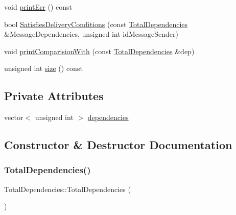 \begin{DoxyCompactItemize}
\item 
void \hyperlink{class_total_dependencies_a514df10fe452f2000ceec5e279eae802}{print\+Err} () const
\item 
bool \hyperlink{class_total_dependencies_a6d050146cb0298091a4614610997d772}{Satisfies\+Delivery\+Conditions} (const \hyperlink{class_total_dependencies}{Total\+Dependencies} \&Message\+Dependencies, unsigned int id\+Message\+Sender)
\item 
void \hyperlink{class_total_dependencies_a56c23f6400891bc8acb3a2bd03f42b12}{print\+Comparision\+With} (const \hyperlink{class_total_dependencies}{Total\+Dependencies} \&dep)
\item 
unsigned int \hyperlink{class_total_dependencies_a00ea27540cc51d5770d6013a21a41de2}{size} () const
\end{DoxyCompactItemize}
\subsection*{Private Attributes}
\begin{DoxyCompactItemize}
\item 
vector$<$ unsigned int $>$ \hyperlink{class_total_dependencies_a94825b4f782c30dfebf69dd2eba0bb1f}{dependencies}
\end{DoxyCompactItemize}


\subsection{Constructor \& Destructor Documentation}
\mbox{\label{class_total_dependencies_ae066781ee6df2248ee0091a094c1fc1b}} 
\subsubsection{\texorpdfstring{Total\+Dependencies()}{TotalDependencies()}\hspace{0.1cm}{\footnotesize\ttfamily [1/3]}}
{\footnotesize\ttfamily Total\+Dependencies\+::\+Total\+Dependencies (\begin{DoxyParamCaption}{ }\end{DoxyParamCaption})}

\mbox{\label{class_total_dependencies_a8bed75c4fa1477c1a5ca07df4c5191cd}} 
